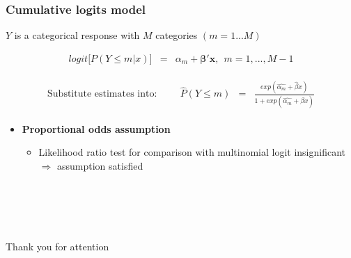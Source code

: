 \documentclass{beamer}              %
\begin{document}








\begin{frame}

\frametitle{Cumulative logits model}\label{Results-Logit2} 

 $Y$ is a categorical response with $M$ categories $(m=1...M)$

\begin{equation}\label{PCumLog}
\begin{array}{lclcl}
logit  \big[P( Y \leq m| x) \big] &=& \alpha_m + \boldsymbol{\beta'x}, ~~m=1,...,M-1
\end{array}
\end{equation}

\begin{align*}\label{Stickin}
\begin{array}{lcl}
\text{Substitute estimates into:} \hspace{1cm}\hat{P}(Y\leq m) &=& \frac{exp(\hat{\alpha_m}+ \hat{\beta} x)}{1+exp(\hat{\alpha_m}+ \hat{\beta} x)}
\end{array}
\end{align*}

\vspace{0.5cm}
\begin{itemize}
\item \textbf{Proportional odds assumption}
\begin{itemize}
\item Likelihood ratio test for comparison with multinomial logit insignificant $\boldsymbol{\Rightarrow}$ assumption satisfied

\end{itemize}

\end{itemize}

\end{frame}








\section*{~~}

\begin{frame}
\centering
\huge{Thank you for attention}
\end{frame}


\end{document}
